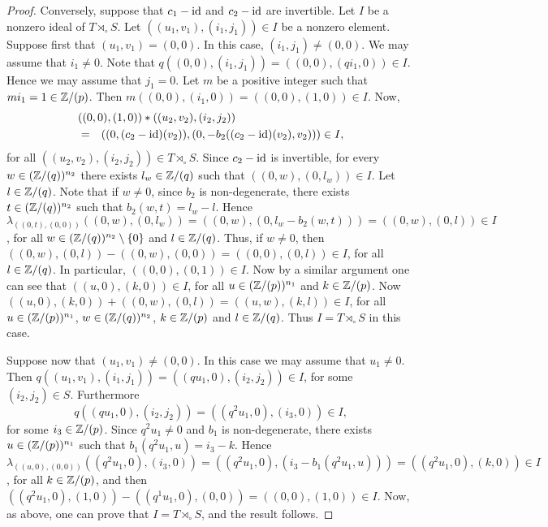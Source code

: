 \begin{proof}
Conversely, suppose that $c_1-\operatorname{id}$ and $c_2-\operatorname{id}$ are invertible. Let $I$ be a nonzero ideal of $T\rtimes_{\circ}S$.
Let $((u_1,v_1),(i_1,j_1))\in I$ be a nonzero element. Suppose first that $(u_1,v_1)=(0,0)$. In this case, $(i_1,j_1)\neq (0,0)$. We may assume that $i_1\neq 0$. Note that $q((0,0),(i_1,j_1))=((0,0),(qi_1,0))\in I$. Hence we may assume that $j_1=0$. Let $m$ be a positive integer such that $mi_1=1\in\mathbb{Z}/(p)$. Then
$m((0,0),(i_1,0))=((0,0),(1,0))\in I$. Now,  
\begin{eqnarray*}\lefteqn{((0,0),(1,0))*((u_2,v_2),(i_2,j_2))}\\
	&=&((0,(c_2-\id)(v_2)),(0,-b_2((c_2-\id)(v_2),v_2)))\in I,
\end{eqnarray*}
for all $((u_2,v_2),(i_2,j_2))\in T\rtimes_{\circ}S$. Since $c_2-\operatorname{id}$ is invertible, for every $w\in (\mathbb{Z}/(q))^{n_2}$ there exists $l_{w}\in \mathbb{Z}/(q)$ such that
$((0,w),(0,l_{w}))\in I$. Let $l\in \mathbb{Z}/(q)$. Note that if $w\neq 0$, since $b_2$ is non-degenerate, 
there exists $t\in (\mathbb{Z}/(q))^{n_2}$ such that $b_2(w,t)=l_{w}-l$. Hence $\lambda_{((0,t),(0,0))}((0,w),(0,l_w))=((0,w),(0,l_w-b_2(w,t)))=((0,w),(0,l))\in I$, for all $w\in (\mathbb{Z}/(q))^{n_2}\setminus\{0\}$ and $l\in \mathbb{Z}/(q)$. Thus, if $w\neq 0$, then $((0,w),(0,l))-((0,w),(0,0))=((0,0),(0,l))\in I$, for all $l\in\mathbb{Z}/(q)$. In particular, $((0,0),(0,1))\in I$. Now by a similar argument one can see that $((u,0),(k,0))\in I$, for all $u\in (\mathbb{Z}/(p))^{n_1}$ and $k\in\mathbb{Z}/(p)$. Now
$((u,0),(k,0))+((0,w),(0,l))=((u,w),(k,l))\in I$, for all $u\in (\mathbb{Z}/(p))^{n_1}$, $w\in (\mathbb{Z}/(q))^{n_2}$, $k\in\mathbb{Z}/(p)$ and $l\in\mathbb{Z}/(q)$.
Thus $I=T\rtimes_{\circ}S$ in this case. 

Suppose now that $(u_1,v_1)\neq (0,0)$. In this case we may assume that $u_1\neq 0$. Then $q((u_1,v_1),(i_1,j_1))=((qu_1,0),(i_2,j_2))\in I$, for some $(i_2,j_2)\in S$. Furthermore 
$$q((qu_1,0),(i_2,j_2))=((q^2u_1,0),(i_3,0))\in I,$$ 
for some $i_3\in\mathbb{Z}/(p)$. Since $q^2u_1\neq 0$ and $b_1$ is non-degenerate, there exists $u\in (\mathbb{Z}/(p))^{n_1}$ such that $b_1(q^2u_1,u)=i_3-k$. Hence
$\lambda_{((u,0),(0,0))}((q^2u_1,0),(i_3,0))=((q^2u_1,0),(i_3-b_1(q^2u_1,u)))=((q^2u_1,0),(k,0))\in I$, for all $k\in\mathbb{Z}/(p)$, and then
$((q^2u_1,0),(1,0))-((q^1u_1,0),(0,0))=((0,0),(1,0))\in I$. Now, as above, one can prove that $I=T\rtimes_{\circ}S$, and the result follows.
\end{proof}

